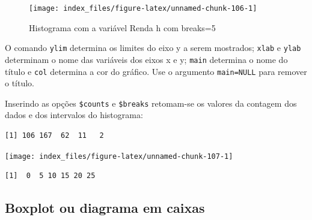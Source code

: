 \documentclass[12pt,brazil,oneside]{book}
\newenvironment{Shaded}{\begin{snugshade}}{\end{snugshade}}
\newcommand{\DataTypeTok}[1]{\textcolor[rgb]{0.13,0.29,0.53}{#1}}
\newcommand{\DecValTok}[1]{\textcolor[rgb]{0.00,0.00,0.81}{#1}}
\newcommand{\KeywordTok}[1]{\textcolor[rgb]{0.13,0.29,0.53}{\textbf{#1}}}
\newcommand{\NormalTok}[1]{#1}
\newcommand{\OperatorTok}[1]{\textcolor[rgb]{0.81,0.36,0.00}{\textbf{#1}}}
\newcommand{\StringTok}[1]{\textcolor[rgb]{0.31,0.60,0.02}{#1}}
\begin{document}
\begin{figure}[H]

{\centering \texttt{[image: index\_files/figure-latex/unnamed-chunk-106-1]} 

}

\caption{Histograma com a variável Renda h com breaks=5}\label{fig:unnamed-chunk-106}
\end{figure}

O comando \texttt{ylim} determina os limites do eixo y a serem mostrados; \texttt{xlab} e \texttt{ylab} determinam o nome das variáveis dos eixos x e y; \texttt{main} determina o nome do título e \texttt{col} determina a cor do gráfico. Use o argumento \texttt{main=NULL} para remover o título.

Inserindo as opções \texttt{\$counts} e \texttt{\$breaks} retomam-se os valores da contagem dos dados e dos intervalos do histograma:

\begin{Shaded}
\end{Shaded}

\begin{verbatim}
[1] 106 167  62  11   2
\end{verbatim}

\begin{Shaded}
\end{Shaded}

\begin{center}\texttt{[image: index\_files/figure-latex/unnamed-chunk-107-1]} \end{center}

\begin{verbatim}
[1]  0  5 10 15 20 25
\end{verbatim}

\hypertarget{boxplot-ou-diagrama-em-caixas}{%
\subsection{Boxplot ou diagrama em caixas}\label{boxplot-ou-diagrama-em-caixas}}
\end{document}
